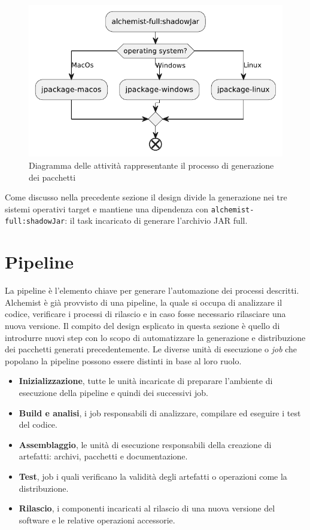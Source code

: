 \begin{figure}[htb]
	\centering
	\includegraphics[width=.8\linewidth]{figures/gradle-jpackage-scheme.pdf}
	\caption{Diagramma delle attività rappresentante il processo di generazione dei pacchetti}
	\label{fig:gradle-jpackage-scheme}
\end{figure}
\noindent Come discusso nella precedente sezione il design divide la generazione nei tre sistemi operativi target e mantiene una dipendenza con \texttt{al\-che\-mi\-st\--fu\-ll\-:sha\-dow\-Jar\-}: il task incaricato di generare l'archivio JAR full.

\section{Pipeline}
La pipeline è l'elemento chiave per generare l'automazione dei processi descritti. Alchemist è già provvisto di una pipeline, la quale si occupa di analizzare il codice, verificare i processi di rilascio e in caso fosse necessario rilasciare una nuova versione. Il compito del design esplicato in questa sezione è quello di introdurre nuovi step con lo scopo di automatizzare la generazione e distribuzione dei pacchetti generati precedentemente. Le diverse unità di esecuzione o \textit{job} che popolano la pipeline possono essere distinti in base al loro ruolo.
\begin{itemize}
	\item \textbf{Inizializzazione}, tutte le unità incaricate di preparare l'ambiente di esecuzione della pipeline e quindi dei successivi job. 
	\item \textbf{Build e analisi}, i job responsabili di analizzare, compilare ed eseguire i test del codice.
	\item \textbf{Assemblaggio}, le unità di esecuzione responsabili della creazione di artefatti: archivi, pacchetti e documentazione.
	\item \textbf{Test}, job i quali verificano la validità degli artefatti o operazioni come la distribuzione.
	\item \textbf{Rilascio}, i componenti incaricati al rilascio di una nuova versione del software e le relative operazioni accessorie.
\end{itemize}

